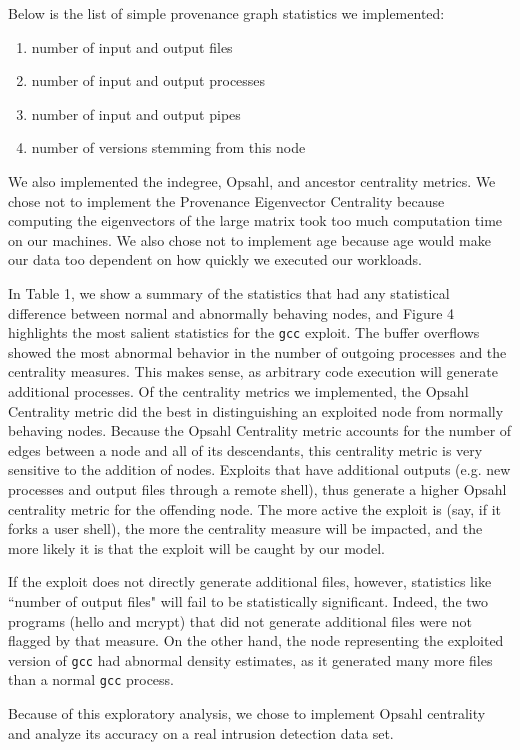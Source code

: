 \documentclass[10pt,twocolumn]{article}
\begin{document}
Below is the list of simple provenance graph statistics we implemented:
\begin{enumerate}
\item number of input and output files
\item number of input and output processes
\item number of input and output pipes
\item number of versions stemming from this node
\end{enumerate}
We also implemented the indegree, Opsahl, and ancestor centrality metrics.
We chose not to implement the Provenance Eigenvector Centrality because computing
the eigenvectors of the large matrix took too much computation time on our machines.
We also chose not to implement age because age would make our data too dependent
on how quickly we executed our workloads.

In Table 1, we show a summary of the statistics that had any statistical difference between normal and abnormally behaving nodes, and Figure 4 highlights the most salient statistics for the \texttt{gcc} exploit. The buffer overflows showed the most abnormal behavior in the number of outgoing processes and the centrality measures. This makes sense, as arbitrary code execution will generate additional processes. Of the centrality metrics we implemented, the Opsahl Centrality metric did the best in distinguishing an exploited node from normally behaving nodes. Because the Opsahl Centrality metric accounts for the number of edges between a node and all of its descendants, this centrality metric is very sensitive to the addition of nodes. Exploits that have additional outputs (e.g. new processes and output files through a remote shell), thus generate a higher Opsahl centrality metric for the offending node. The more active the exploit is (say, if it forks a user shell), the more the centrality measure will be impacted, and the more likely it is that the exploit will be caught by our model.

If the exploit does not directly generate additional files, however, statistics like ``number of output files" will fail to be statistically significant. Indeed, the two programs (hello and mcrypt) that did not generate additional files were not flagged by that measure. On the other hand, the node representing the exploited version of \texttt{gcc} had abnormal density estimates, as it generated many more files than a normal \texttt{gcc} process. 

Because of this exploratory analysis, we chose to implement Opsahl centrality and analyze its accuracy on a real intrusion detection data set.
\end{document}
